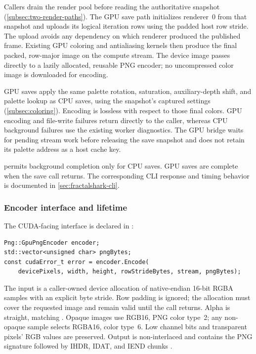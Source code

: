 Callers drain the render pool before reading the authoritative
 snapshot (\cref{subsec:two-render-paths}). The GPU save
path initializes renderer~0 from that snapshot and uploads its logical
iteration rows using the padded host row stride. The upload avoids any
dependency on which renderer produced the published frame. Existing
GPU coloring and antialiasing kernels then produce the final packed,
row-major  image on the compute stream. The device image
passes directly to a lazily allocated, reusable PNG encoder; no
uncompressed color image is downloaded for encoding.

GPU saves apply the same palette rotation, saturation, auxiliary-depth shift,
and palette lookup as CPU saves, using the snapshot's captured settings
(\cref{subsec:coloring}).
Encoding is lossless with respect to those final colors. GPU encoding
and file-write failures return directly to the caller, whereas CPU
background failures use the existing worker diagnostics. The GPU bridge
waits for pending stream work before releasing the save snapshot and
does not retain its palette address as a host cache key.

 permits background completion only
for CPU saves. GPU saves are complete when the save call returns.
The corresponding CLI response and timing behavior is documented in
\cref{sec:fractalshark-cli}.

\subsubsection{Encoder interface and lifetime}

The CUDA-facing interface is declared in
:

\begin{lstlisting}
Png::GpuPngEncoder encoder;
std::vector<unsigned char> pngBytes;
const cudaError_t error = encoder.Encode(
    devicePixels, width, height, rowStrideBytes, stream, pngBytes);
\end{lstlisting}

The input is a caller-owned device allocation of native-endian 16-bit
RGBA samples with an explicit byte stride. Row padding is ignored;
the allocation must cover the requested image and remain valid until
the call returns. Alpha is straight, matching .
Opaque images use RGB16, PNG color type~2; any non-opaque sample selects
RGBA16, color type~6. Low channel bits and transparent pixels' RGB
values are preserved. Output is non-interlaced and contains the PNG
signature followed by IHDR, IDAT, and IEND chunks
\cite{PNGThirdEdition2025}.

